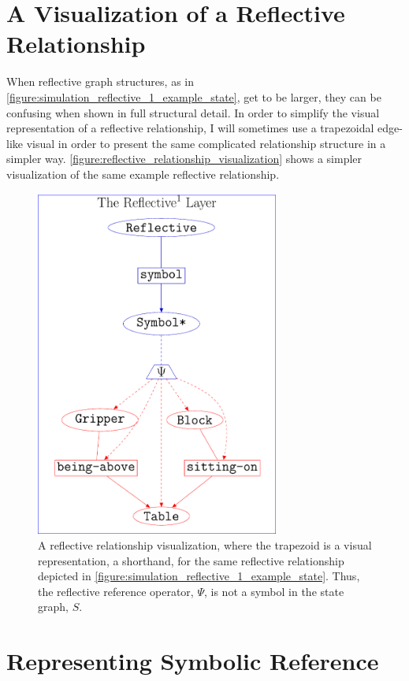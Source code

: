 \section{A Visualization of a Reflective Relationship}

When reflective graph structures, as in
{\mbox{\autoref{figure:simulation_reflective_1_example_state}}}, get
to be larger, they can be confusing when shown in full structural
detail.  In order to simplify the visual representation of a
reflective relationship, I will sometimes use a trapezoidal edge-like
visual in order to present the same complicated relationship structure
in a simpler way.
{\mbox{\autoref{figure:reflective_relationship_visualization}}} shows
a simpler visualization of the same example reflective relationship.
\begin{figure}
\center
\includegraphics[width=8cm]{gfx/reflective_relationship_visualization}
\caption[A reflective relationship visualization.]{A reflective
  relationship visualization, where the trapezoid is a visual
  representation, a shorthand, for the same reflective relationship
  depicted in
  {\mbox{\autoref{figure:simulation_reflective_1_example_state}}}.
  Thus, the reflective reference operator, $\Psi$, is not a symbol in
  the state graph, $S$.}
\label{figure:reflective_relationship_visualization}
\end{figure}

\section{Representing Symbolic Reference}

